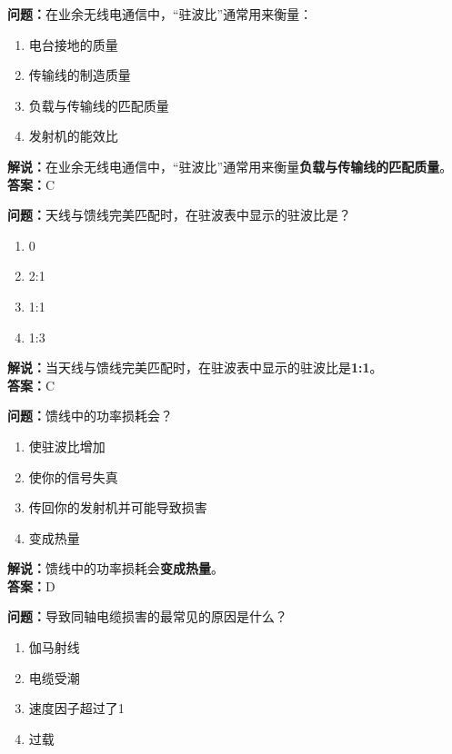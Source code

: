 \documentclass{ctexbook}
\begin{document}
\bigskip


\noindent\textbf{问题：}在业余无线电通信中，“驻波比”通常用来衡量：

\begin{enumerate}[label=\Alph*), leftmargin=3em]
	\item 电台接地的质量
	\item 传输线的制造质量
	\item 负载与传输线的匹配质量
	\item 发射机的能效比
\end{enumerate}

\noindent\textbf{解说：}在业余无线电通信中，“驻波比”通常用来衡量\textbf{负载与传输线的匹配质量}。\\\noindent\textbf{答案：}C


\bigskip


\noindent\textbf{问题：}天线与馈线完美匹配时，在驻波表中显示的驻波比是？

\begin{enumerate}[label=\Alph*), leftmargin=3em]
	\item 0
	\item 2:1
	\item 1:1
	\item 1:3
\end{enumerate}

\noindent\textbf{解说：}当天线与馈线完美匹配时，在驻波表中显示的驻波比是\textbf{1:1}。\\\noindent\textbf{答案：}C


\bigskip


\noindent\textbf{问题：}馈线中的功率损耗会？

\begin{enumerate}[label=\Alph*), leftmargin=3em]
	\item 使驻波比增加
	\item 使你的信号失真
	\item 传回你的发射机并可能导致损害
	\item 变成热量
\end{enumerate}

\noindent\textbf{解说：}馈线中的功率损耗会\textbf{变成热量}。\\\noindent\textbf{答案：}D


\bigskip


\noindent\textbf{问题：}导致同轴电缆损害的最常见的原因是什么？

\begin{enumerate}[label=\Alph*), leftmargin=3em]
	\item 伽马射线
	\item 电缆受潮
	\item 速度因子超过了1
	\item 过载
\end{enumerate}
\end{document}
